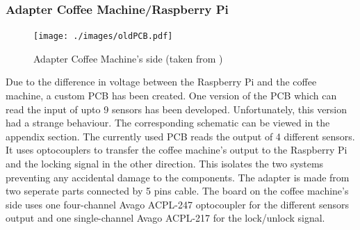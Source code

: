\documentclass[12pt]{article}
\begin{document}
  \subsubsection{Adapter Coffee Machine/Raspberry Pi} \label{pcb}
   \begin{figure}[H]
   \centering
   \texttt{[image: ./images/oldPCB.pdf]}
   \captionsetup{justification=centering}
   \caption{Adapter Coffee Machine's side (taken from \cite{BachelorThesis})}
   \label{fig:realpcb}
  \end{figure}
  Due to the difference in voltage between the Raspberry Pi and the coffee machine, a custom PCB has been created.
  One version of the PCB which can read the input of upto 9 sensors has been developed. Unfortunately, this version had a strange behaviour.
  The corresponding schematic can be viewed in the appendix section. The currently used PCB reads the output of 4 different sensors.
  It uses optocouplers to transfer the coffee machine's output to the Raspberry Pi and the locking signal in the other direction. 
  This isolates the two systems preventing any accidental damage to the components.
  The adapter is made from two seperate parts connected by 5 pins cable.
  The board on the coffee machine's side uses one four-channel Avago ACPL-247 optocoupler for the different sensors output and one single-channel Avago ACPL-217 
  for the lock/unlock signal.\\
  
  
\end{document}
